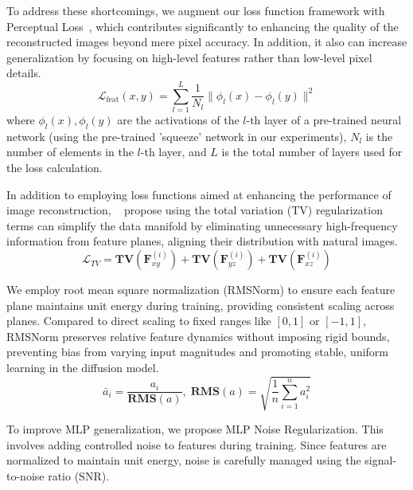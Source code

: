 \documentclass[letterpaper]{article} %
\begin{document}
To address these shortcomings, we augment our loss function framework with Perceptual Loss~\cite{johnson2016perceptual}, which contributes significantly to enhancing the quality of the reconstructed images beyond mere pixel accuracy. In addition, it also can increase generalization by focusing on high-level features rather than low-level pixel details.
\begin{equation}
\mathcal{L}_\text{feat}(x, y) = \sum_{l=1}^{L} \frac{1}{N_l} \|\phi_l(x) - \phi_l(y)\|^2
\end{equation}
where $\phi_l(x),\phi_l(y)$ are the activations of the $l$-th layer of a pre-trained neural network (using the pre-trained 'squeeze' network in our experiments), $N_l$ is the number of elements in the $l$-th layer, and $L$ is the total number of layers used for the loss calculation.

In addition to employing loss functions aimed at enhancing the performance of image reconstruction, ~\cite{shue20233d} propose using the total variation (TV) regularization terms can simplify the data manifold by eliminating unnecessary high-frequency information from feature planes, aligning their distribution with natural images. 
\begin{equation}
\mathcal{L}_{TV} = \mathbf{TV}(\mathbf{F}_{xy}^{(i)}) + \mathbf{TV}(\mathbf{F}_{yz}^{(i)}) + \mathbf{TV}(\mathbf{F}_{xz}^{(i)})
\end{equation}

We employ root mean square normalization (RMSNorm) \cite{zhang2019root} to ensure each feature plane maintains unit energy during training, providing consistent scaling across planes. Compared to direct scaling to fixed ranges like $[0,1]$ or $[-1,1]$, RMSNorm \cite{zhang2019root} preserves relative feature dynamics without imposing rigid bounds, preventing bias from varying input magnitudes and promoting stable, uniform learning in the diffusion model.
\begin{equation}
\bar{a}_i = \frac{a_i}{\mathbf{RMS}(a)}, \; \mathbf{RMS}(a) = \sqrt{\frac{1}{n} \sum_{i=1}^n a_i^2}
\end{equation}

To improve MLP generalization, we propose MLP Noise Regularization. This involves adding controlled noise to features during training. Since features are normalized to maintain unit energy, noise is carefully managed using the signal-to-noise ratio (SNR).
\end{document}
